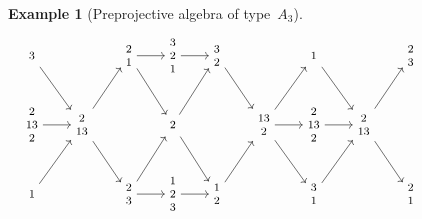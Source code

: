 \documentclass{amsart}
\theoremstyle{definition}
\newtheorem{example}[theorem]{Example}
\begin{document}
\begin{example}[Preprojective algebra of type~$A_3$]
 \[
  \hspace*{-2cm}
 {\footnotesize
  \begin{tikzcd}
   \begin{matrix} 3 \end{matrix}\arrow[dr] && \begin{matrix} 2 \\ 1 \end{matrix}\arrow[r]\arrow[dr] & \begin{matrix} 3 \\ 2 \\ 1 \end{matrix}\arrow[r]& \begin{matrix} 3 \\ 2 \end{matrix}\arrow[dr] && \begin{matrix} 1 \end{matrix}\arrow[dr]&& \begin{matrix} 2 \\ 3 \end{matrix} \\
   \begin{matrix} 2 \\ 13 \\ 2 \end{matrix}\ar[r] & \begin{matrix} 2\\ 13 \end{matrix}\arrow[ur]\arrow[dr] && \begin{matrix} 2 \end{matrix}\arrow[ur]\arrow[dr] && \begin{matrix} 13\\2 \end{matrix}\arrow[ur]\arrow[dr]\arrow[r] & \begin{matrix} 2\\13\\2 \end{matrix}\arrow[r] & \begin{matrix} 2\\13 \end{matrix}\arrow[ur]\arrow[dr] &  \\
   \begin{matrix} 1 \end{matrix}\arrow[ur] && \begin{matrix} 2\\3 \end{matrix}\arrow[ur]\arrow[r] & \begin{matrix} 1\\2\\3 \end{matrix}\arrow[r] & \begin{matrix} 1\\2 \end{matrix}\arrow[ur] && \begin{matrix} 3\\1 \end{matrix}\arrow[ur] && \begin{matrix} 2\\1 \end{matrix}

\end{tikzcd}}\]
\end{example}
\end{document}
